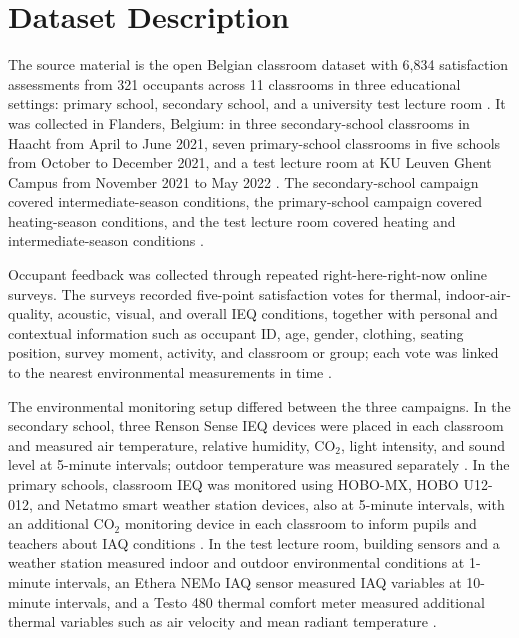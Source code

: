 ﻿\documentclass[11pt]{article}
\newcommand{\Reviewed}[1]{\begingroup\color{black}#1\endgroup}
\begin{document}
\Reviewed{
\section{Dataset Description}

The source material is the open Belgian classroom dataset with 6{,}834 satisfaction assessments from 321 occupants across 11 classrooms in three educational settings: primary school, secondary school, and a university test lecture room \cite{carton2026dataset}. It was collected in Flanders, Belgium: in three secondary-school classrooms in Haacht from April to June 2021, seven primary-school classrooms in five schools from October to December 2021, and a test lecture room at KU Leuven Ghent Campus from November 2021 to May 2022 \cite{carton2026dataset}. The secondary-school campaign covered intermediate-season conditions, the primary-school campaign covered heating-season conditions, and the test lecture room covered heating and intermediate-season conditions \cite{carton2026dataset}.

Occupant feedback was collected through repeated right-here-right-now online surveys. The surveys recorded five-point satisfaction votes for thermal, indoor-air-quality, acoustic, visual, and overall IEQ conditions, together with personal and contextual information such as occupant ID, age, gender, clothing, seating position, survey moment, activity, and classroom or group; each vote was linked to the nearest environmental measurements in time \cite{carton2026dataset}.

The environmental monitoring setup differed between the three campaigns. In the secondary school, three Renson Sense IEQ devices were placed in each classroom and measured air temperature, relative humidity, CO$_2$, light intensity, and sound level at 5-minute intervals; outdoor temperature was measured separately \cite{carton2026dataset}. In the primary schools, classroom IEQ was monitored using HOBO-MX, HOBO U12-012, and Netatmo smart weather station devices, also at 5-minute intervals, with an additional CO$_2$ monitoring device in each classroom to inform pupils and teachers about IAQ conditions \cite{carton2026dataset}. In the test lecture room, building sensors and a weather station measured indoor and outdoor environmental conditions at 1-minute intervals, an Ethera NEMo IAQ sensor measured IAQ variables at 10-minute intervals, and a Testo 480 thermal comfort meter measured additional thermal variables such as air velocity and mean radiant temperature \cite{carton2026dataset}.

}
\end{document}
